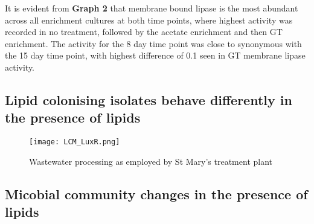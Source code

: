 \documentclass[11pt]{article}
\begin{document}


It is evident from  \textbf{Graph 2} that membrane bound lipase is the most abundant across all enrichment cultures at both time points, where highest activity was recorded in no treatment, followed by the acetate enrichment and then GT enrichment.  The activity for the 8 day time point was close to synonymous with the 15 day time point, with highest difference of 0.1 seen in GT membrane lipase activity.

\subsection{Lipid colonising isolates behave differently in the presence of lipids}

\begin{figure}
\texttt{[image: LCM\_LuxR.png]}
\caption{Wastewater processing as employed by St Mary's treatment plant \cite{stmarys}}
\end{figure}


\subsection{Micobial community changes in the presence of lipids}
\end{document}
